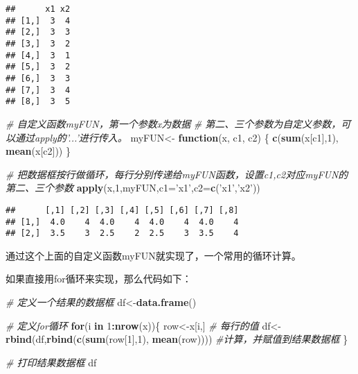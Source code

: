 \documentclass[]{book}
\newenvironment{Shaded}{\begin{snugshade}}{\end{snugshade}}
\newcommand{\CommentTok}[1]{\textcolor[rgb]{0.56,0.35,0.01}{\textit{#1}}}
\newcommand{\ControlFlowTok}[1]{\textcolor[rgb]{0.13,0.29,0.53}{\textbf{#1}}}
\newcommand{\DataTypeTok}[1]{\textcolor[rgb]{0.13,0.29,0.53}{#1}}
\newcommand{\DecValTok}[1]{\textcolor[rgb]{0.00,0.00,0.81}{#1}}
\newcommand{\KeywordTok}[1]{\textcolor[rgb]{0.13,0.29,0.53}{\textbf{#1}}}
\newcommand{\NormalTok}[1]{#1}
\newcommand{\OperatorTok}[1]{\textcolor[rgb]{0.81,0.36,0.00}{\textbf{#1}}}
\newcommand{\StringTok}[1]{\textcolor[rgb]{0.31,0.60,0.02}{#1}}
\begin{document}
\begin{verbatim}
##      x1 x2
## [1,]  3  4
## [2,]  3  3
## [3,]  3  2
## [4,]  3  1
## [5,]  3  2
## [6,]  3  3
## [7,]  3  4
## [8,]  3  5
\end{verbatim}

\begin{Shaded}
\begin{Highlighting}[]
\CommentTok{# 自定义函数myFUN，第一个参数x为数据}
\CommentTok{# 第二、三个参数为自定义参数，可以通过apply的'...'进行传入。}
\NormalTok{myFUN<-}\StringTok{ }\ControlFlowTok{function}\NormalTok{(x, c1, c2) \{}
\KeywordTok{c}\NormalTok{(}\KeywordTok{sum}\NormalTok{(x[c1],}\DecValTok{1}\NormalTok{), }\KeywordTok{mean}\NormalTok{(x[c2])) }
\NormalTok{\}}

\CommentTok{# 把数据框按行做循环，每行分别传递给myFUN函数，设置c1,c2对应myFUN的第二、三个参数}
\KeywordTok{apply}\NormalTok{(x,}\DecValTok{1}\NormalTok{,myFUN,}\DataTypeTok{c1=}\StringTok{'x1'}\NormalTok{,}\DataTypeTok{c2=}\KeywordTok{c}\NormalTok{(}\StringTok{'x1'}\NormalTok{,}\StringTok{'x2'}\NormalTok{))}
\end{Highlighting}
\end{Shaded}

\begin{verbatim}
##      [,1] [,2] [,3] [,4] [,5] [,6] [,7] [,8]
## [1,]  4.0    4  4.0    4  4.0    4  4.0    4
## [2,]  3.5    3  2.5    2  2.5    3  3.5    4
\end{verbatim}

通过这个上面的自定义函数myFUN就实现了，一个常用的循环计算。

如果直接用for循环来实现，那么代码如下：

\begin{Shaded}
\begin{Highlighting}[]
\CommentTok{# 定义一个结果的数据框}
\NormalTok{df<-}\KeywordTok{data.frame}\NormalTok{()}

\CommentTok{# 定义for循环}
\ControlFlowTok{for}\NormalTok{(i }\ControlFlowTok{in} \DecValTok{1}\OperatorTok{:}\KeywordTok{nrow}\NormalTok{(x))\{}
\NormalTok{  row<-x[i,]                                         }\CommentTok{# 每行的值}
\NormalTok{  df<-}\KeywordTok{rbind}\NormalTok{(df,}\KeywordTok{rbind}\NormalTok{(}\KeywordTok{c}\NormalTok{(}\KeywordTok{sum}\NormalTok{(row[}\DecValTok{1}\NormalTok{],}\DecValTok{1}\NormalTok{), }\KeywordTok{mean}\NormalTok{(row))))    }\CommentTok{#计算，并赋值到结果数据框}
\NormalTok{  \}}

\CommentTok{# 打印结果数据框}
\NormalTok{df}
\end{Highlighting}
\end{Shaded}
\end{document}

